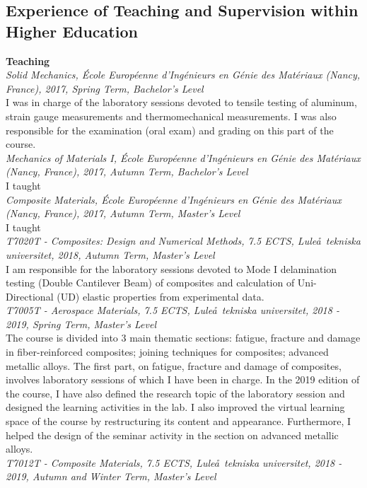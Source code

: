 \documentclass[
  a4paper, 
]{fortysecondscv}
\begin{document}
\subsection{Experience of Teaching and Supervision within Higher Education}
\textbf{Teaching}\\[3pt]
\textit{Solid Mechanics, \'Ecole Europ\'eenne d'Ing\'enieurs en G\'enie des Mat\'eriaux (Nancy, France), 2017, Spring Term, Bachelor's Level}\\
I was in charge of the laboratory sessions devoted to tensile testing of aluminum, strain gauge measurements and thermomechanical measurements. I was also responsible for the examination (oral exam) and grading on this part of the course.\\[3pt]
\textit{Mechanics of Materials I, \'Ecole Europ\'eenne d'Ing\'enieurs en G\'enie des Mat\'eriaux (Nancy, France), 2017, Autumn Term, Bachelor's Level}\\
I taught\\[3pt]
\textit{Composite Materials, \'Ecole Europ\'eenne d'Ing\'enieurs en G\'enie des Mat\'eriaux (Nancy, France), 2017, Autumn Term, Master's Level}\\
I taught\\[3pt]
\textit{T7020T - Composites: Design and Numerical Methods, 7.5 ECTS, Lule\aa\ tekniska universitet, 2018, Autumn Term, Master's Level}\\
I am responsible for the laboratory sessions devoted to Mode I delamination testing (Double Cantilever Beam) of composites and calculation of Uni-Directional (UD) elastic properties from experimental data.\\[3pt]
\textit{T7005T - Aerospace Materials, 7.5 ECTS, Lule\aa\ tekniska universitet, 2018 - 2019, Spring Term, Master's Level}\\
The course is divided into 3 main thematic sections: fatigue, fracture and damage in fiber-reinforced composites; joining techniques for composites; advanced metallic alloys. The first part, on fatigue, fracture and damage of composites, involves laboratory sessions of which I have been in charge. In the 2019 edition of the course, I have also defined the research topic of the laboratory session and designed the learning activities in the lab. I also improved the virtual learning space of the course by restructuring its content and appearance. Furthermore, I helped the design of the seminar activity in the section on advanced metallic alloys.\\[3pt]
\textit{T7012T - Composite Materials, 7.5 ECTS, Lule\aa\ tekniska universitet, 2018 - 2019, Autumn and Winter Term, Master's Level}\\
\end{document}
